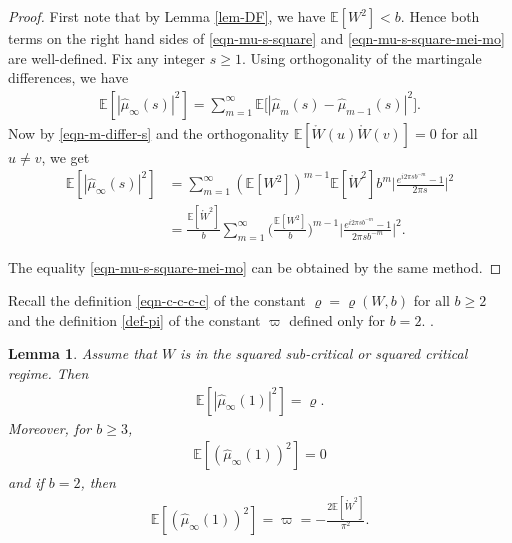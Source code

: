 \documentclass[12pt]{amsart}
\newtheorem{lemma}[theorem]{Lemma}
\theoremstyle{definition}
\theoremstyle{remark}
\newcommand{\E}{\mathbb{E}}
\numberwithin{equation}{section}
\begin{document}
\begin{proof}
First note that by Lemma \ref{lem-DF}, we have 
$
\E[W^2]<b. 
$
Hence both terms on the right hand sides of \eqref{eqn-mu-s-square} and \eqref{eqn-mu-s-square-mei-mo} are well-defined. 
Fix any integer $s\ge 1$.  Using  orthogonality of the martingale differences, we have 
\begin{align*}
\E[|\widehat{\mu}_\infty(s)|^2] =\sum_{m=1}^\infty\E\big[|\widehat{\mu}_{m}(s)-\widehat{\mu}_{m-1}(s)|^2\big]. 
\end{align*} 
Now by  \eqref{eqn-m-differ-s}  and the orthogonality $\E[\mathring{W} (u) \mathring{W}(v)]=0$ for all $u\ne v$, we get   
\begin{align*}
\E[|\widehat{\mu}_\infty(s)|^2]
&=\sum_{m=1}^\infty (\E[W^2])^{m-1}\E[\mathring{W}^2]b^{m}\Big|\frac{e^{i2\pi sb^{-m}}-1}{2\pi s}\Big|^2\\
&=\frac{\E[\mathring{W}^2]}{b}\sum_{m=1}^\infty \Big(\frac{\E[W^2]}{b}\Big)^{m-1}\Big|\frac{e^{i2\pi sb^{-m}}-1}{2\pi s b^{-m}}\Big|^2.
\end{align*}

The equality  \eqref{eqn-mu-s-square-mei-mo} can be obtained by the same method.
\end{proof}



Recall the definition \eqref{eqn-c-c-c-c} of the constant $\varrho = \varrho(W,b)$  for all $b \ge 2$ and the definition \eqref{def-pi} of the constant $\varpi$ defined only for $b=2$. . 

\begin{lemma}\label{coro-97}
Assume that $W$ is in the squared sub-critical or squared critical regime. Then 
\begin{align}\label{eqn-mu-s-square-s=1}
\E[|\widehat{\mu}_\infty(1)|^2]=\varrho. 
\end{align}
Moreover, for  $b \ge 3$, 
\begin{align}\label{eqn-mu-s-square-mei-mo-1}
\mathbb{E}\left[(\widehat{\mu}_{\infty}(1))^2\right] =0
\end{align}
and if $b = 2$, then 
\begin{align}\label{b2-square}
\mathbb{E}\left[(\widehat{\mu}_{\infty}(1))^2\right] =  \varpi = - \frac{2 \E[\mathring{W}^2]}{\pi^2}. 
\end{align}
\end{lemma}
\end{document}
